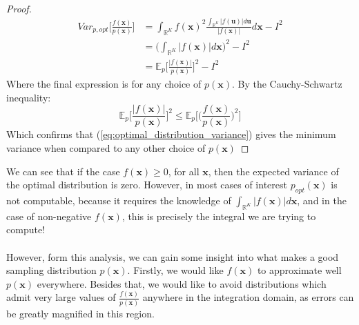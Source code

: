 \begin{proof}
    \begin{equation}\label{eq:optimal_distribution_variance}
        \begin{split}
          Var_{p,opt}\bigg[ \frac{f(\mathbf{x})}{p(\mathbf{x})} \bigg] & = \int_{\mathbb{R}^K} f(\mathbf{x})^2 \frac{\int_{\mathbb{R}^K} |f(\mathbf{u})| d \mathbf{u}}{|f(\mathbf{x})|} d \mathbf{x} - I^2 \\
          & = \bigg( \int_{\mathbb{R}^K} |f(\mathbf{x})| d \mathbf{x} \bigg)^2 - I^2 \\
          & = \mathbb{E}_p \bigg[\frac{|f(\mathbf{x})|}{p(\mathbf{x})} \bigg]^2 - I^2
        \end{split}
    \end{equation}
    Where the final expression is for any choice of \(p(\mathbf{x})\). By the Cauchy-Schwartz inequality:
    \begin{equation*}
        \mathbb{E}_p \bigg[\frac{|f(\mathbf{x})|}{p(\mathbf{x})} \bigg]^2 \leq \mathbb{E}_p \bigg[ \bigg( \frac{f(\mathbf{x})}{p(\mathbf{x})} \bigg)^2 \bigg]
    \end{equation*}
    Which confirms that (\ref{eq:optimal_distribution_variance}) gives the minimum variance when compared to any other choice of \(p(\mathbf{x})\)
\end{proof}

We can see that if the case \(f(\mathbf{x}) \geq 0\), for all \(\mathbf{x}\), then the expected variance of the optimal distribution is zero. However, in most cases of interest \(p_{opt}(\mathbf{x})\) is not computable, because it requires the knowledge of \(\int_{\mathbb{R}^K} |f(\mathbf{x})| d \mathbf{x}\), and in the case of non-negative \(f(\mathbf{x})\), this is precisely the integral we are trying to compute!
\\\\
However, form this analysis, we can gain some insight into what makes a good sampling distribution \(p(\mathbf{x})\). Firstly, we would like \(f(\mathbf{x})\) to approximate well \( p(\mathbf{x})\) everywhere. Besides that, we would like to avoid distributions which admit very large values of \(\frac{f(\mathbf{x})}{p(\mathbf{x})}\) anywhere in the integration domain, as errors can be greatly magnified in this region. 

